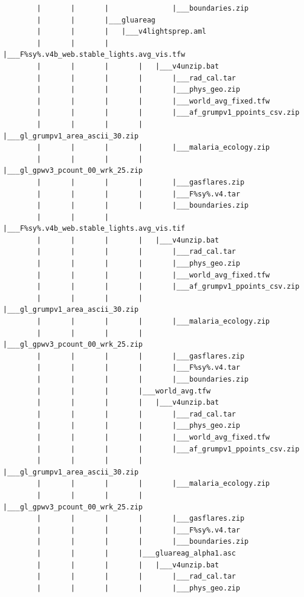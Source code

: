 \documentclass[]{book}
\begin{document}
\begin{verbatim}
        |       |       |               |___boundaries.zip
        |       |       |___gluareag
        |       |       |   |___v4lightsprep.aml
        |       |       |       |___F%sy%.v4b_web.stable_lights.avg_vis.tfw
        |       |       |       |   |___v4unzip.bat
        |       |       |       |       |___rad_cal.tar
        |       |       |       |       |___phys_geo.zip
        |       |       |       |       |___world_avg_fixed.tfw
        |       |       |       |       |___af_grumpv1_ppoints_csv.zip
        |       |       |       |       |___gl_grumpv1_area_ascii_30.zip
        |       |       |       |       |___malaria_ecology.zip
        |       |       |       |       |___gl_gpwv3_pcount_00_wrk_25.zip
        |       |       |       |       |___gasflares.zip
        |       |       |       |       |___F%sy%.v4.tar
        |       |       |       |       |___boundaries.zip
        |       |       |       |___F%sy%.v4b_web.stable_lights.avg_vis.tif
        |       |       |       |   |___v4unzip.bat
        |       |       |       |       |___rad_cal.tar
        |       |       |       |       |___phys_geo.zip
        |       |       |       |       |___world_avg_fixed.tfw
        |       |       |       |       |___af_grumpv1_ppoints_csv.zip
        |       |       |       |       |___gl_grumpv1_area_ascii_30.zip
        |       |       |       |       |___malaria_ecology.zip
        |       |       |       |       |___gl_gpwv3_pcount_00_wrk_25.zip
        |       |       |       |       |___gasflares.zip
        |       |       |       |       |___F%sy%.v4.tar
        |       |       |       |       |___boundaries.zip
        |       |       |       |___world_avg.tfw
        |       |       |       |   |___v4unzip.bat
        |       |       |       |       |___rad_cal.tar
        |       |       |       |       |___phys_geo.zip
        |       |       |       |       |___world_avg_fixed.tfw
        |       |       |       |       |___af_grumpv1_ppoints_csv.zip
        |       |       |       |       |___gl_grumpv1_area_ascii_30.zip
        |       |       |       |       |___malaria_ecology.zip
        |       |       |       |       |___gl_gpwv3_pcount_00_wrk_25.zip
        |       |       |       |       |___gasflares.zip
        |       |       |       |       |___F%sy%.v4.tar
        |       |       |       |       |___boundaries.zip
        |       |       |       |___gluareag_alpha1.asc
        |       |       |       |   |___v4unzip.bat
        |       |       |       |       |___rad_cal.tar
        |       |       |       |       |___phys_geo.zip

\end{verbatim}
\end{document}
